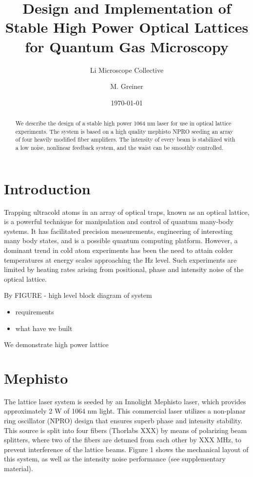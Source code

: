 \documentclass[twocolumn,aps,pra,showpacs,preprintnumbers,bibnotes]{revtex4-1}
\begin{document}
\title{Design and Implementation of Stable High Power Optical Lattices for Quantum Gas Microscopy}


\author{Li Microscope Collective}
\author{M. Greiner}

\date{\today}
\begin{abstract}
We describe the design of a stable high power 1064 nm laser for use in optical lattice experiments. The system is based on a high quality mephisto NPRO seeding an array of four heavily modified fiber amplifiers. The intensity of every beam is stabilized with a low noise, nonlinear feedback system, and the waist can be smoothly controlled. 
\end{abstract}
\maketitle
\section{Introduction}
Trapping ultracold atoms in an array of optical traps, known as an optical lattice, is a powerful technique for manipulation and control of quantum many-body systems. 
It has facilitated precision measurements, engineering of interesting many body states, and is a possible quantum computing platform.
However, a dominant trend in cold atom experiments has been the need to attain colder temperatures at energy scales approaching the Hz level.
Such experiments are limited by heating rates arising from positional, phase and intensity noise of the optical lattice. 

By FIGURE - high level block diagram of system

\begin{itemize}
	\item requirements 
	\item what have we built
\end{itemize}

We demonstrate high power lattice 


\section{Mephisto}
The lattice laser system is seeded by an Innolight Mephisto laser, which provides approximately 2 W of 1064 nm light. 
This commercial laser utilizes a non-planar ring oscillator (NPRO) design that ensures superb phase and intensity stability. This source is split into four fibers (Thorlabs XXX) by means of polarizing beam splitters, where two of the fibers are detuned from each other by XXX MHz, to prevent interference of the lattice beams. Figure 1 shows the mechanical layout of this system, as well as the intensity noise performance (see supplementary material).
\end{document}
